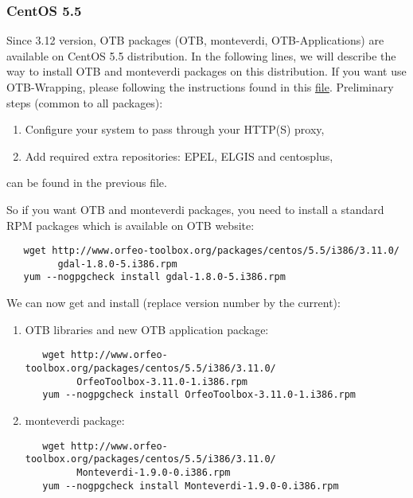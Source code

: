 \subsubsection{CentOS 5.5}
\label{ssec:centos_binaries}
Since 3.12 version, OTB packages (OTB, monteverdi, OTB-Applications) are available on CentOS 5.5 distribution. In the following lines, we will describe the way to install OTB and monteverdi packages on this distribution. If you want use OTB-Wrapping, please following the instructions found in this \href{http://www.orfeo-toolbox.org/packages/centos/5.5/i386/3.12.0/OTB_packages_on_CentOS_5.5.txt}{file}. Preliminary steps (common to all packages):

\begin{enumerate}

  \item Configure your system to pass through your HTTP(S) proxy,

  \item Add required extra repositories: EPEL, ELGIS and centosplus, 

\end{enumerate}
can be found in the previous file.

So if you want OTB and monteverdi packages, you need to install a standard RPM packages which is available on OTB website: 
   \begin{verbatim}
   wget http://www.orfeo-toolbox.org/packages/centos/5.5/i386/3.11.0/
         gdal-1.8.0-5.i386.rpm
   yum --nogpgcheck install gdal-1.8.0-5.i386.rpm
   \end{verbatim}
We can now get and install (replace version number by the current):

\begin{enumerate}
\item OTB libraries and new OTB application package: 
   \begin{verbatim}
   wget http://www.orfeo-toolbox.org/packages/centos/5.5/i386/3.11.0/
         OrfeoToolbox-3.11.0-1.i386.rpm
   yum --nogpgcheck install OrfeoToolbox-3.11.0-1.i386.rpm
   \end{verbatim}
\item monteverdi package:
   \begin{verbatim}
   wget http://www.orfeo-toolbox.org/packages/centos/5.5/i386/3.11.0/
         Monteverdi-1.9.0-0.i386.rpm
   yum --nogpgcheck install Monteverdi-1.9.0-0.i386.rpm
   \end{verbatim}
\end{enumerate}



